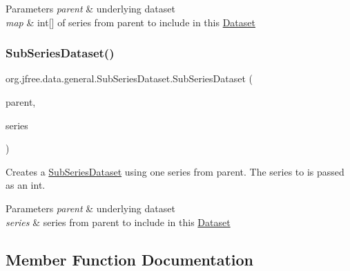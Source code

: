 \begin{DoxyParams}{Parameters}
{\em parent} & underlying dataset \\
\hline
{\em map} & int\mbox{[}\mbox{]} of series from parent to include in this \mbox{\hyperlink{interfaceorg_1_1jfree_1_1data_1_1general_1_1_dataset}{Dataset}} \\
\hline
\end{DoxyParams}
\mbox{\label{classorg_1_1jfree_1_1data_1_1general_1_1_sub_series_dataset_a4cf7071a07791c1790a06c3cc546a649}} 
\subsubsection{\texorpdfstring{Sub\+Series\+Dataset()}{SubSeriesDataset()}\hspace{0.1cm}{\footnotesize\ttfamily [2/2]}}
{\footnotesize\ttfamily org.\+jfree.\+data.\+general.\+Sub\+Series\+Dataset.\+Sub\+Series\+Dataset (\begin{DoxyParamCaption}\item[{\mbox{\hyperlink{interfaceorg_1_1jfree_1_1data_1_1general_1_1_series_dataset}{Series\+Dataset}}}]{parent,  }\item[{int}]{series }\end{DoxyParamCaption})}

Creates a \mbox{\hyperlink{classorg_1_1jfree_1_1data_1_1general_1_1_sub_series_dataset}{Sub\+Series\+Dataset}} using one series from {\ttfamily parent}. The series to is passed as an int.


\begin{DoxyParams}{Parameters}
{\em parent} & underlying dataset \\
\hline
{\em series} & series from parent to include in this \mbox{\hyperlink{interfaceorg_1_1jfree_1_1data_1_1general_1_1_dataset}{Dataset}} \\
\hline
\end{DoxyParams}


\subsection{Member Function Documentation}
\mbox{\label{classorg_1_1jfree_1_1data_1_1general_1_1_sub_series_dataset_a0811cf5e7e6b2e05cd783980f1c17703}} 
